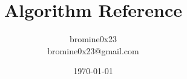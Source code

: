 \title{\Huge Algorithm Reference}
\author{\huge bromine0x23\\\small bromine0x23@gmail.com}
\date{\today}
\maketitle